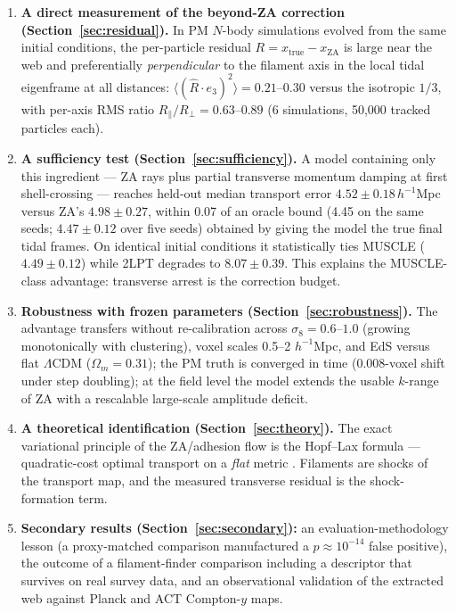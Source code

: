 \documentclass[11pt]{article}
\begin{document}
\begin{enumerate}
\item \textbf{A direct measurement of the beyond-ZA correction (Section~\ref{sec:residual}).} In PM $N$-body simulations evolved from the same initial conditions, the per-particle residual $R = x_{\mathrm{true}} - x_{\mathrm{ZA}}$ is large near the web and preferentially \emph{perpendicular} to the filament axis in the local tidal eigenframe at all distances: $\langle(\hat{R}\cdot e_3)^2\rangle = 0.21$--$0.30$ versus the isotropic $1/3$, with per-axis RMS ratio $R_\parallel/R_\perp = 0.63$--$0.89$ (6 simulations, 50,000 tracked particles each).
\item \textbf{A sufficiency test (Section~\ref{sec:sufficiency}).} A model containing only this ingredient --- ZA rays plus partial transverse momentum damping at first shell-crossing --- reaches held-out median transport error $4.52 \pm 0.18\,h^{-1}$Mpc versus ZA's $4.98 \pm 0.27$, within 0.07 of an oracle bound (4.45 on the same seeds; $4.47 \pm 0.12$ over five seeds) obtained by giving the model the true final tidal frames. On identical initial conditions it statistically ties MUSCLE ($4.49 \pm 0.12$) while 2LPT degrades to $8.07 \pm 0.39$. This explains the MUSCLE-class advantage: transverse arrest is the correction budget.
\item \textbf{Robustness with frozen parameters (Section~\ref{sec:robustness}).} The advantage transfers without re-calibration across $\sigma_8 = 0.6$--$1.0$ (growing monotonically with clustering), voxel scales 0.5--2 $h^{-1}$Mpc, and EdS versus flat $\Lambda$CDM ($\Omega_m = 0.31$); the PM truth is converged in time (0.008-voxel shift under step doubling); at the field level the model extends the usable $k$-range of ZA with a rescalable large-scale amplitude deficit.
\item \textbf{A theoretical identification (Section~\ref{sec:theory}).} The exact variational principle of the ZA/adhesion flow is the Hopf--Lax formula --- quadratic-cost optimal transport on a \emph{flat} metric \cite{hopf1950,lax1957,brenier1991,frisch2002}. Filaments are shocks of the transport map, and the measured transverse residual is the shock-formation term.
\item \textbf{Secondary results (Section~\ref{sec:secondary}):} an evaluation-methodology lesson (a proxy-matched comparison manufactured a $p \approx 10^{-14}$ false positive), the outcome of a filament-finder comparison including a descriptor that survives on real survey data, and an observational validation of the extracted web against Planck and ACT Compton-$y$ maps.
\end{enumerate}
\end{document}
